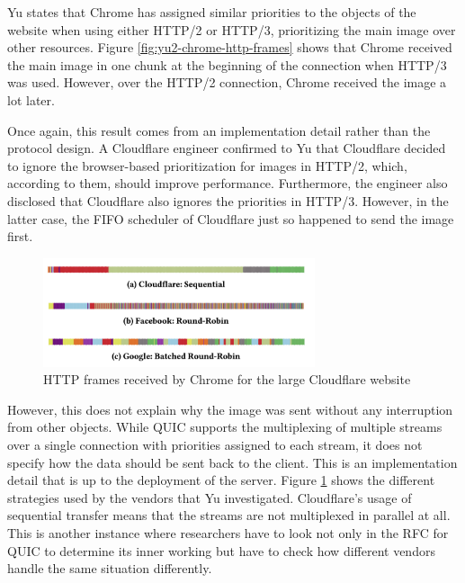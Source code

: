 \documentclass[conference]{IEEEtran}
\begin{document}
Yu states that Chrome has assigned similar priorities to the objects of the website when using either HTTP/2 or HTTP/3, prioritizing the main image over other resources. Figure \ref{fig:yu2-chrome-http-frames} shows that Chrome received the main image in one chunk at the beginning of the connection when HTTP/3 was used. However, over the HTTP/2 connection, Chrome received the image a lot later. 

Once again, this result comes from an implementation detail rather than the protocol design. A Cloudflare engineer confirmed to Yu that Cloudflare decided to ignore the browser-based prioritization for images in HTTP/2, which, according to them, should improve performance. Furthermore, the engineer also disclosed that Cloudflare also ignores the priorities in HTTP/3. However, in the latter case, the FIFO scheduler of Cloudflare just so happened to send the image first.

\begin{figure}[htbp]
  \begin{center}
  \includegraphics[width=8cm,keepaspectratio]{images/Yu2/HTTP3 multiplexing strategies.png}
  \caption{HTTP frames received by Chrome for the large Cloudflare website}
  \label{fig:yu2-multiplexing-strategies}
  \end{center}
\end{figure}

However, this does not explain why the image was sent without any interruption from other objects. While QUIC supports the multiplexing of multiple streams over a single connection with priorities assigned to each stream, it does not specify how the data should be sent back to the client. This is an implementation detail that is up to the deployment of the server. Figure \ref{fig:yu2-multiplexing-strategies} shows the different strategies used by the vendors that Yu investigated. Cloudflare's usage of sequential transfer means that the streams are not multiplexed in parallel at all. This is another instance where researchers have to look not only in the RFC for QUIC to determine its inner working but have to check how different vendors handle the same situation differently.
\end{document}

